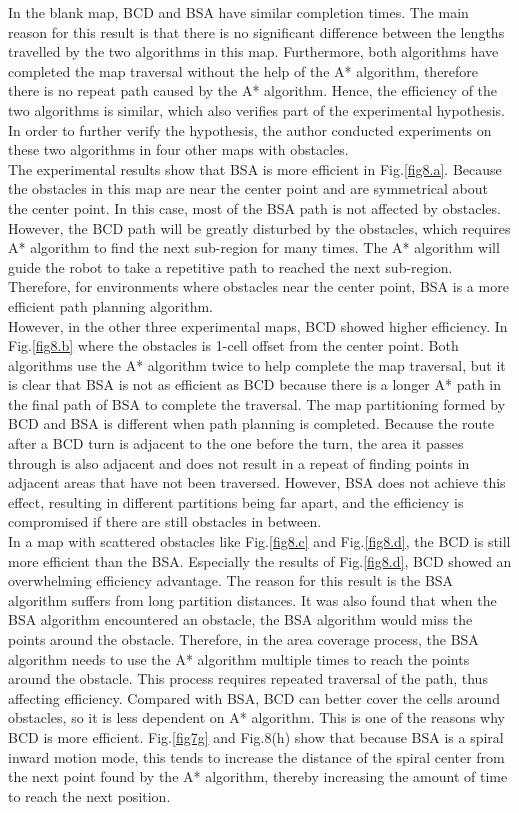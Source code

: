 \documentclass[conference]{IEEEtran}
\begin{document}
In the blank map, BCD and BSA have similar completion times. The main reason for this result is that there is no significant difference between the lengths travelled by the two algorithms in this map. Furthermore, both algorithms have completed the map traversal without the help of the A* algorithm, therefore there is no repeat path caused by the A* algorithm. Hence, the efficiency of the two algorithms is similar, which also verifies part of the experimental hypothesis.\\
In order to further verify the hypothesis, the author conducted experiments on these two algorithms in four other maps with obstacles.\\
The experimental results show that BSA is more efficient in Fig.\ref{fig8.a}. Because the obstacles in this map are near the center point and are symmetrical about the center point. In this case, most of the BSA path is not affected by obstacles. However, the BCD path will be greatly disturbed by the obstacles, which requires A* algorithm to find the next sub-region for many times. The A* algorithm will guide the robot to take a repetitive path to reached the next sub-region. Therefore, for environments where obstacles near the center point, BSA is a more efficient path planning algorithm.\\
However, in the other three experimental maps, BCD showed higher efficiency. In Fig.\ref{fig8.b} where the  obstacles is 1-cell offset from the center point. Both algorithms use the A* algorithm twice to help complete the map traversal, but it is clear that BSA is not as efficient as BCD because there is a longer A* path in the final path of BSA to complete the traversal. The map partitioning formed by BCD and BSA is different when path planning is completed. Because the route after a BCD turn is adjacent to the one before the turn, the area it passes through is also adjacent and does not result in a repeat of finding points in adjacent areas that have not been traversed. However, BSA does not achieve this effect, resulting in different partitions being far apart, and the efficiency is compromised if there are still obstacles in between.\\
In a map with scattered obstacles like Fig.\ref{fig8.c} and Fig.\ref{fig8.d}, the BCD is still more efficient than the BSA. Especially the results of Fig.\ref{fig8.d}, BCD showed an overwhelming efficiency advantage. The reason for this result is the BSA algorithm suffers from long partition distances. It was also found that when the BSA algorithm encountered an obstacle, the BSA algorithm would miss the points around the obstacle. Therefore, in the area coverage process, the BSA algorithm needs to use the A* algorithm multiple times to reach the points around the obstacle. This process requires repeated traversal of the path, thus affecting efficiency. Compared with BSA, BCD can better cover the cells around obstacles, so it is less dependent on A* algorithm. This is one of the reasons why BCD is more efficient. Fig.\ref{fig7g} and Fig.8(h) show that because BSA is a spiral inward motion mode, this tends to increase the distance of the spiral center from the next point found by the A* algorithm, thereby increasing the amount of time to reach the next position. \\
\end{document}
